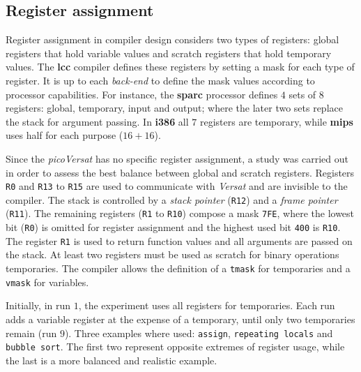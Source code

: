 \documentclass[journal]{IEEEtran}
\begin{document}
\subsection{Register assignment}

Register assignment in compiler design considers two types of registers:
global registers that hold variable values and scratch registers that hold
temporary values.
The {\bf lcc} compiler defines these registers by setting a mask for each
type of register.
It is up to each {\it back-end} to define the mask values according to processor
capabilities.
For instance, the {\bf sparc} processor defines $4$ sets of $8$ registers:
global, temporary, input and output; where the later two sets replace
the stack for argument passing.
In {\bf i386} all $7$ registers are temporary, while {\bf mips} uses half
for each purpose ($16+16$).

Since the {\it picoVersat} has no specific register assignment, a study
was carried out in order to assess the best balance between global and
scratch registers.
Registers {\tt R0} and {\tt R13} to {\tt R15} are used to communicate with {\it Versat}
and are invisible to the compiler.
The stack is controlled by a {\it stack pointer} ({\tt R12}) and a {\it frame pointer}
({\tt R11}).
The remaining registers ({\tt R1} to {\tt R10}) compose a mask {\tt 7FE}, where
the lowest bit ({\tt R0}) is omitted for register assignment and the highest
used bit {\tt 400} is {\tt R10}.
The register {\tt R1} is used to return function values and all arguments are
passed on the stack.
At least two registers must be used as scratch for binary operations
temporaries.
The compiler allows the definition of a {\tt tmask} for temporaries and a
{\tt vmask} for variables.

Initially, in run $1$, the experiment uses all registers for temporaries.
Each run adds a variable register at the expense of a temporary, until only
two temporaries remain (run $9$).
Three examples where used: {\tt assign}, {\tt repeating locals} and
{\tt bubble sort}.
The first two represent opposite extremes of register usage, while the last is
a more balanced and realistic example.
\end{document}
